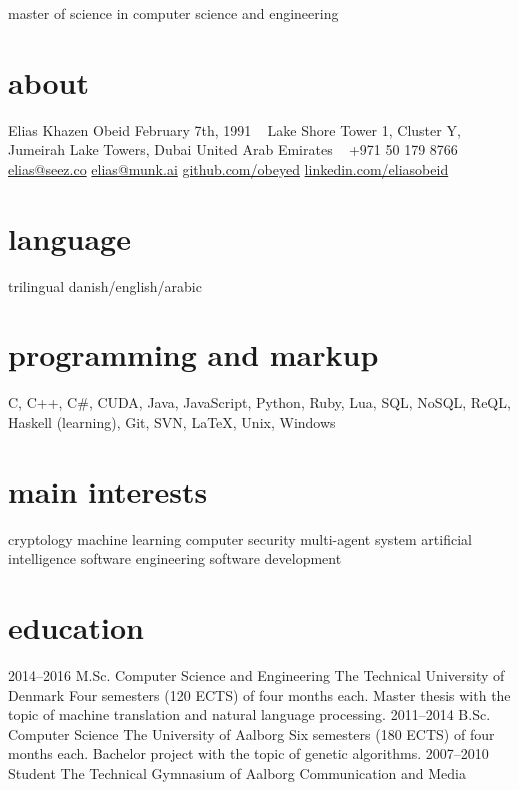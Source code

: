 \documentclass[print]{friggeri-cv}
\begin{document}
    {master of science in computer science and engineering}

\begin{aside}
  \section{about}
    Elias Khazen Obeid
    February 7th, 1991
    ~
    Lake Shore Tower 1, Cluster Y, Jumeirah Lake Towers, Dubai
    United Arab Emirates
    ~
    +971 50 179 8766
    \href{mailto:elias@seez.co}{elias@seez.co}
    \href{mailto:elias@munk.ai}{elias@munk.ai}
    \href{https://github.com/obeyed}{github.com/obeyed}
    \href{https://www.linkedin.com/in/eliasobeid}{linkedin.com/eliasobeid}
  \section{language}
    trilingual danish/english/arabic
  \section{programming and markup}
    C, C++, C\#, CUDA, Java, JavaScript, Python, Ruby, Lua, 
    SQL, NoSQL, ReQL, 
    Haskell (learning),
    Git, SVN, \LaTeX{}, Unix, Windows
  \section{main interests}
    cryptology
    machine learning
    computer security
    multi-agent system
    artificial intelligence
    software engineering
    software development
\end{aside}

\section{education}

\begin{entrylist}
  \entry
    {2014--2016}
    {M.Sc. {\normalfont Computer Science and Engineering}}
    {The Technical University of Denmark}
    {Four semesters (120 ECTS) of four months each.
	Master thesis with the topic of machine translation and natural language processing.}
  \entry
    {2011--2014}
    {B.Sc. {\normalfont Computer Science}}
    {The University of Aalborg}
    {Six semesters (180 ECTS) of four months each.
	Bachelor project with the topic of genetic algorithms.}
  \entry
    {2007--2010}
    {Student}
    {The Technical Gymnasium of Aalborg}
    {Communication and Media}
\end{entrylist}
\end{document}
